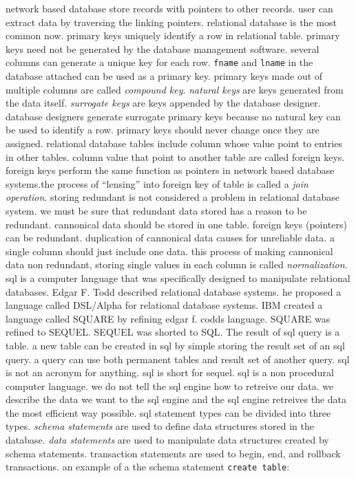\documentclass[a4paper]{article}
\begin{document}
network based database store records with pointers to other records. user can extract data by traversing the linking pointers.
relational database is the most common now. primary keys uniquely identify a row in relational table. primary keys need not be
generated by the database management software. several columns can generate a unique key for each row. \lstinline{fname} and
\lstinline{lname} in the database attached can be used as a primary key. primary keys made out of multiple columns are called
\emph{compound key}. \emph{natural keys} are keys generated from the data itself. \emph{surrogate keys} are keys appended 
by the database designer. database designers generate surrogate primary keys because no natural key can be used to identify
a row. primary keys should never change once they are assigned. relational database tables include column whose value point
to entries in other tables. column value that point to another table are called foreign keys. foreign keys perform the same
function as pointers in network based database systems.the process of ``lensing'' into foreign key of table is called a
\emph{join operation}. storing redundant is not considered a problem in relational database system. we must be sure that 
redundant data stored has a reason to be redundant. cannonical data should be stored in one table. foreign keys (pointers)
can be redundant. duplication of cannonical data causes for unreliable data. a single column should just include one data.
this process of making cannonical data non redundant, storing single values in each column is called \emph{normalization}.
sql is a computer language that was specifically designed to manipulate relational databases. Edgar F. Todd described relational
database systems. he proposed a language called DSL/Alpha for relational database systems. IBM created a language called 
SQUARE by refining edgar f. codds language. SQUARE was refined to SEQUEL. SEQUEL was shorted to SQL. The result of sql query 
is a table. a new table can be created in sql by simple storing the result set of an sql query. a query can use both permanent
tables and result set of another query. sql is not an acronym for anything. sql is short for sequel. sql is a non procedural
computer language. we do not tell the sql engine how to retreive our data. we describe the data we want to the sql engine and
the sql engine retreives the data the most efficient way possible. sql statement types can be divided into three types. 
\emph{schema statements} are used to define data structures stored in the database. \emph{data statements} are used to manipulate 
data structures created by schema statements. transaction statements are used to begin, end, and rollback transactions. 
an example of a the schema statement \lstinline{create table}:
\end{document}
